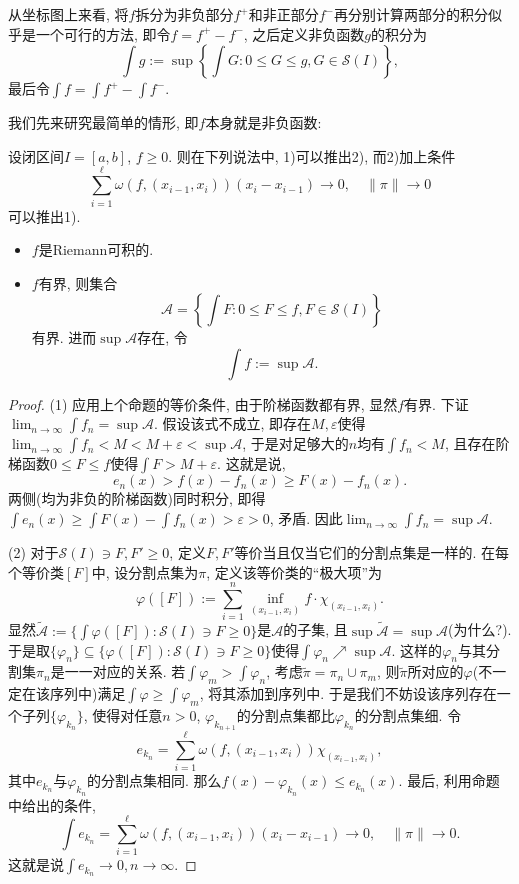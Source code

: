 从坐标图上来看, 将$f$拆分为非负部分$f^+$和非正部分$f^-$再分别计算两部分的积分似乎是一个可行的方法, 即令$f=f^+-f^-$, 之后定义非负函数$g$的积分为$$\int g := \sup \left\{ \int G:0\leq G \leq g, G \in \mathcal{S}(I)  \right\}, $$
最后令$\int f = \int f^+ - \int f^-$. 

我们先来研究最简单的情形, 即$f$本身就是非负函数: 

\begin{proposition}{} \label{pro:fwfuhjuubijb}
	设闭区间$I=[a,b]$, $f \geq 0$. 则在下列说法中, 1)可以推出2), 而2)加上条件$$\sum_{i=1}^{\ell} \omega (f,(x_{i-1},x_i)) (x_i-x_{i-1}) \to 0,\quad \| \pi \| \to 0$$可以推出1). 
	\begin{itemize}
		\item $f$是Riemann可积的. 
		\item $f$有界, 则集合$$\mathcal{A} = \left\{ \int F:0\leq F \leq f, F \in \mathcal{S}(I)  \right\}$$
		有界. 进而$\sup \mathcal{A}$存在, 令$$\int f := \sup \mathcal{A}.$$
	\end{itemize}
\end{proposition}
\begin{proof}
	(1) 应用上个命题的等价条件, 由于阶梯函数都有界, 显然$f$有界. 下证$\lim_{n\to \infty} \int f_n = \sup \mathcal{A}$. 假设该式不成立, 即存在$M,\varepsilon$使得$\lim_{n\to \infty} \int f_n < M < M+\varepsilon < \sup \mathcal{A}$, 于是对足够大的$n$均有$\int f_n < M$, 且存在阶梯函数$0\leq F \leq f$使得$\int F > M+\varepsilon$. 这就是说, $$e_n(x) > f(x)-f_n(x) \geq F(x)-f_n(x).$$
	两侧(均为非负的阶梯函数)同时积分, 即得$\int e_n(x) \geq \int F(x) - \int f_n(x) > \varepsilon >0$, 矛盾. 因此$\lim_{n\to \infty} \int f_n = \sup \mathcal{A}$. 
	
	(2) 对于$\mathcal{S}(I) \ni F,F' \geq 0$, 定义$F,F'$等价当且仅当它们的分割点集是一样的. 在每个等价类$[F]$中, 设分割点集为$\pi$, 定义该等价类的“极大项”为$$\varphi ([F]) := \sum_{i=1}^{n} \inf_{(x_{i-1},x_i)} f \cdot \chi _{(x_{i-1},x_i)}.$$
	显然$\tilde{\mathcal{A}}:=\{ \int \varphi ([F]):\mathcal{S}(I) \ni F \geq 0 \}$是$\mathcal{A}$的子集, 且$\sup \tilde{\mathcal{A}} = \sup \mathcal{A}$(为什么?). 于是取$\{ \varphi _n \} \subseteq \{ \varphi ([F]):\mathcal{S}(I) \ni F \geq 0 \}$使得$\int \varphi _n \nearrow \sup \mathcal{A}$. 这样的$\varphi _n$与其分割集$\pi _n$是一一对应的关系. 若$\int \varphi _m > \int \varphi _n$, 考虑$\tilde{\pi} = \pi _n \cup \pi _m$, 则$\tilde{\pi}$所对应的$\varphi$(不一定在该序列中)满足$\int \varphi \geq \int \varphi _m$, 将其添加到序列中. 于是我们不妨设该序列存在一个子列$\{ \varphi _{k_n} \}$, 使得对任意$n>0$, $\varphi _{k_{n+1}}$的分割点集都比$\varphi _{k_{n}}$的分割点集细. 令$$e_{k_n} = \sum_{i=1}^{\ell} \omega (f,(x_{i-1},x_i)) \chi _{(x_{i-1},x_i)}, $$
	其中$e_{k_n}$与$\varphi _{k_n}$的分割点集相同. 那么$f(x)-\varphi _{k_n}(x) \leq e_{k_n}(x)$. 最后, 利用命题中给出的条件, $$\int e_{k_n} = \sum_{i=1}^{\ell} \omega (f,(x_{i-1},x_i)) (x_i-x_{i-1}) \to 0, \quad \| \pi \| \to 0. $$
	这就是说$\int e_{k_n} \to 0,n \to \infty$. 
\end{proof}
